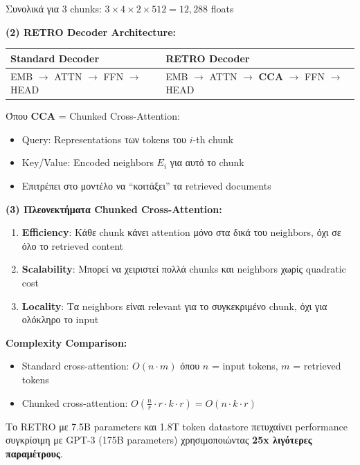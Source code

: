 Συνολικά για 3 chunks: $3 \times 4 \times 2 \times 512 = 12,288$ floats

\textbf{(2) RETRO Decoder Architecture:}

\begin{center}
\begin{tabular}{ll}
\toprule
\textbf{Standard Decoder} & \textbf{RETRO Decoder} \\
\midrule
EMB $\to$ ATTN $\to$ FFN $\to$ HEAD & EMB $\to$ ATTN $\to$ \textbf{CCA} $\to$ FFN $\to$ HEAD \\
\bottomrule
\end{tabular}
\end{center}

Όπου \textbf{CCA} = Chunked Cross-Attention:
\begin{itemize}
    \item Query: Representations των tokens του $i$-th chunk
    \item Key/Value: Encoded neighbors $E_i$ για αυτό το chunk
    \item Επιτρέπει στο μοντέλο να ``κοιτάξει'' τα retrieved documents
\end{itemize}

\textbf{(3) Πλεονεκτήματα Chunked Cross-Attention:}

\begin{enumerate}
    \item \textbf{Efficiency}: Κάθε chunk κάνει attention μόνο στα δικά του neighbors,
    όχι σε όλο το retrieved content

    \item \textbf{Scalability}: Μπορεί να χειριστεί πολλά chunks και neighbors χωρίς
    quadratic cost

    \item \textbf{Locality}: Τα neighbors είναι relevant για το συγκεκριμένο chunk,
    όχι για ολόκληρο το input
\end{enumerate}

\textbf{Complexity Comparison:}
\begin{itemize}
    \item Standard cross-attention: $O(n \cdot m)$ όπου $n$ = input tokens, $m$ = retrieved tokens
    \item Chunked cross-attention: $O(\frac{n}{r} \cdot r \cdot k \cdot r) = O(n \cdot k \cdot r)$
\end{itemize}

\begin{infobox}
Το RETRO με 7.5B parameters και 1.8T token datastore πετυχαίνει performance
συγκρίσιμη με GPT-3 (175B parameters) χρησιμοποιώντας \textbf{25x λιγότερες παραμέτρους}.
\end{infobox}


